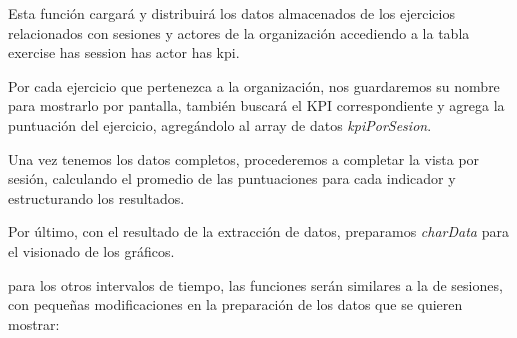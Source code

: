 Esta función cargará y distribuirá los datos almacenados de los ejercicios relacionados con sesiones y actores de la organización accediendo a la tabla exercise has session has actor has kpi.

Por cada ejercicio que pertenezca a la organización, nos guardaremos su nombre para mostrarlo por pantalla, también buscará el KPI correspondiente y agrega la puntuación del ejercicio, agregándolo al array de datos \textit{kpiPorSesion}.

Una vez tenemos los datos completos, procederemos a completar la vista por sesión, calculando el promedio de las puntuaciones para cada indicador y estructurando los resultados.

Por último, con el resultado de la extracción de datos, preparamos \textit{charData} para el visionado de los gráficos.

para los otros intervalos de tiempo, las funciones serán similares a la de sesiones, con pequeñas modificaciones en la preparación de los datos que se quieren mostrar:

